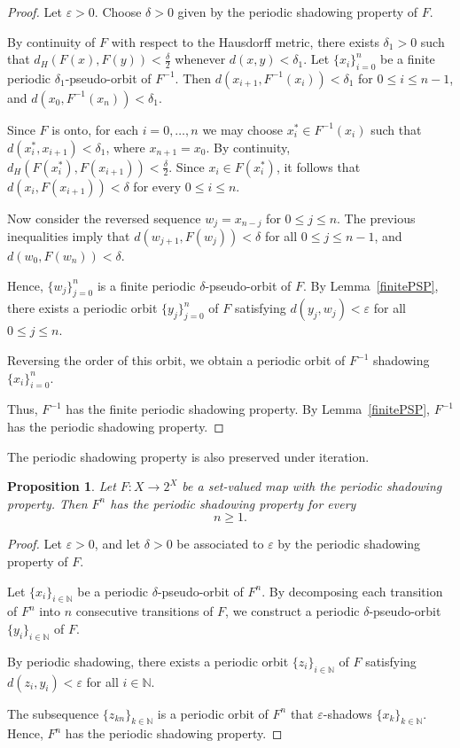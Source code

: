 \documentclass{amsart}
\newtheorem{proposition}[theorem]{Proposition}
\theoremstyle{definition}
\begin{document}
\begin{proof}
Let $\varepsilon>0$. Choose $\delta>0$ given by the periodic shadowing property of $F$.

By continuity of $F$ with respect to the Hausdorff metric, there exists $\delta_1>0$ such that $d_H(F(x),F(y))
<
\frac{\delta}{2}$ whenever $d(x,y)<\delta_1$.
Let $\{x_i\}_{i=0}^{n}$ be a finite periodic $\delta_1$-pseudo-orbit of $F^{-1}$. Then $d(x_{i+1},F^{-1}(x_i))
<
\delta_1$ for $0\leq i\leq n-1$, and $d(x_0,F^{-1}(x_n))
<
\delta_1$.

Since $F$ is onto, for each $i=0,\dots,n$ we may choose $x_i^*\in F^{-1}(x_i)$
such that $d(x_i^*,x_{i+1})
<
\delta_1$,
where $
x_{n+1}=x_0$.
By continuity, $
d_H(F(x_i^*),F(x_{i+1}))
<
\frac{\delta}{2}$.
Since $x_i\in F(x_i^*)$, it follows that $d(x_i,F(x_{i+1}))
<
\delta$ for every $0\leq i\leq n$.

Now consider the reversed sequence $w_j=x_{n-j}$ for $0\leq j\leq n$. 
The previous inequalities imply that $d(w_{j+1},F(w_j))<\delta$ for all $
0\leq j\leq n-1$, and $d(w_0,F(w_n))
<
\delta$. 

Hence, $\{w_j\}_{j=0}^{n}$ is a finite periodic $\delta$-pseudo-orbit of $F$. By Lemma~\ref{finitePSP}, there exists a periodic orbit $\{y_j\}_{j=0}^{n}$ of $F$ satisfying $
d(y_j,w_j)
<
\varepsilon$ for all $0\leq j\leq n$.

Reversing the order of this orbit, we obtain a periodic orbit of $F^{-1}$ shadowing $\{x_i\}_{i=0}^{n}$. 

Thus, $F^{-1}$ has the finite periodic shadowing property. By Lemma~\ref{finitePSP}, $F^{-1}$ has the periodic shadowing property.
\end{proof}

The periodic shadowing property is also preserved under iteration.

\begin{proposition}
Let $F:X\to 2^X$ be a set-valued map with the periodic shadowing property. Then $F^n$ has the periodic shadowing property for every
\[
n\geq1.
\]
\end{proposition}

\begin{proof}
Let $\varepsilon>0$, and let $\delta>0$ be associated to $\varepsilon$ by the periodic shadowing property of $F$.

Let $\{x_i\}_{i\in\mathbb N}$ be a periodic $\delta$-pseudo-orbit of $F^n$. By decomposing each transition of $F^n$ into $n$ consecutive transitions of $F$, we construct a periodic $\delta$-pseudo-orbit $\{y_i\}_{i\in\mathbb N}$ of $F$.

By periodic shadowing, there exists a periodic orbit $\{z_i\}_{i\in\mathbb N}$ 
of $F$ satisfying $d(z_i,y_i)
<
\varepsilon$ for all $i\in\mathbb N$. 

The subsequence $
\{z_{kn}\}_{k\in\mathbb N}$ is a periodic orbit of $F^n$ that $\varepsilon$-shadows $\{x_k\}_{k\in\mathbb N}$. 
Hence, $F^n$ has the periodic shadowing property.
\end{proof}
\end{document}
